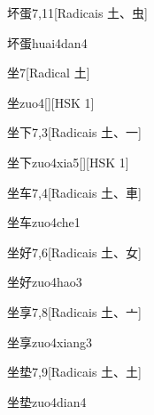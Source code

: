 \begin{entry}{坏蛋}{7,11}[Radicais ⼟、⾍]
  \begin{phonetics}{坏蛋}{huai4dan4}
  \end{phonetics}
\end{entry}

\begin{entry}{坐}{7}[Radical ⼟]
  \begin{phonetics}{坐}{zuo4}[][HSK 1]
  \end{phonetics}
\end{entry}

\begin{entry}{坐下}{7,3}[Radicais ⼟、⼀]
  \begin{phonetics}{坐下}{zuo4xia5}[][HSK 1]
  \end{phonetics}
\end{entry}

\begin{entry}{坐车}{7,4}[Radicais ⼟、⾞]
  \begin{phonetics}{坐车}{zuo4che1}
  \end{phonetics}
\end{entry}

\begin{entry}{坐好}{7,6}[Radicais ⼟、⼥]
  \begin{phonetics}{坐好}{zuo4hao3}
  \end{phonetics}
\end{entry}

\begin{entry}{坐享}{7,8}[Radicais ⼟、⼇]
  \begin{phonetics}{坐享}{zuo4xiang3}
  \end{phonetics}
\end{entry}

\begin{entry}{坐垫}{7,9}[Radicais ⼟、⼟]
  \begin{phonetics}{坐垫}{zuo4dian4}
  \end{phonetics}
\end{entry}

